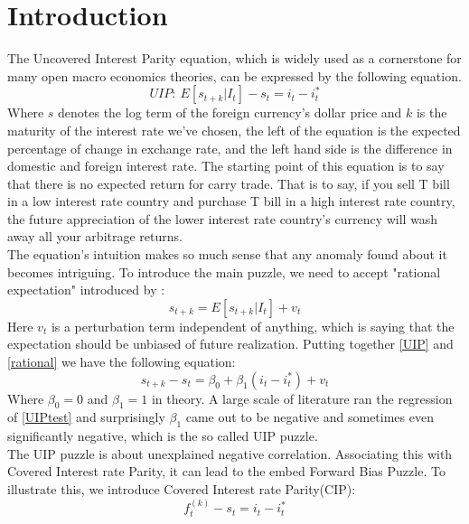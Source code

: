 \documentclass[12pt]{article}
\begin{document}
\section{Introduction}
\indent  The Uncovered Interest Parity equation, which is widely used as a cornerstone for many open macro economics theories, can be expressed by the following equation.
\begin{equation}
UIP:~E[s_{t+k}|I_t] - s_t = i_t - i^*_t \label{UIP}
\end{equation}
\indent Where $s$ denotes the log term of the foreign currency's dollar price and $k$ is the maturity of the interest rate we've chosen, the left of the equation is the expected percentage of change in exchange rate, and the left hand side is the difference in domestic and foreign interest rate. The starting point of this equation is to say that there is no expected return for carry trade. That is to say, if you sell T bill in a low interest rate country and purchase T bill in a high interest rate country, the future appreciation of the lower interest rate country's currency will wash away all your arbitrage returns.\\
\indent The equation's intuition makes so much sense that any anomaly found about it becomes intriguing. To introduce the main puzzle, we need to accept "rational expectation" introduced by \cite{10.2307/1909635}:
 \begin{equation}
 s_{t+k} = E[s_{t+k}|I_t] + v_t \label{rational}
 \end{equation}
\indent Here $v_t$ is a perturbation term independent of anything, which is saying that the expectation should be unbiased of future realization. Putting together \ref{UIP} and \ref{rational} we have the following equation:
 \begin{equation}
 s_{t+k} - s_t = \beta_0 + \beta_1(i_t-i^*_t) + v_t \label{UIPtest}
 \end{equation}
\indent Where $\beta_0 = 0$ and $\beta_1 = 1$ in theory. A large scale of literature ran the regression of \ref{UIPtest} and surprisingly $\beta_1$ came out to be negative and sometimes even significantly negative, which is the so called UIP puzzle. \\
\indent The UIP puzzle is about unexplained negative correlation. Associating this with Covered Interest rate Parity, it can lead to the embed Forward Bias Puzzle. To illustrate this, we introduce Covered Interest rate Parity(CIP):
\begin{equation}
 f_{t}^{(k)} - s_t = i_t - i_t^* \label{CIP}
\end{equation}
\end{document}
